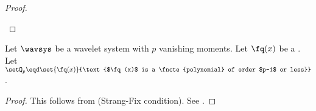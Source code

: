 \begin{proof}
\begin{enumerate}

\end{enumerate}
\end{proof}


\begin{theorem}
\label{thm:sfix_poly}
Let $\wavsys$ be a wavelet system with $p$ vanishing moments.
Let $\fq(x)$ be a .
Let 
  \\\indentx$\setQ_p\eqd\set{\fq(x)}{\text{$\fq(x)$ is a \fncte{polynomial} of order $p-1$ or less}}$.\\
\end{theorem}
\begin{proof}
This follows from 
(Strang-Fix condition).
See .
\end{proof}

